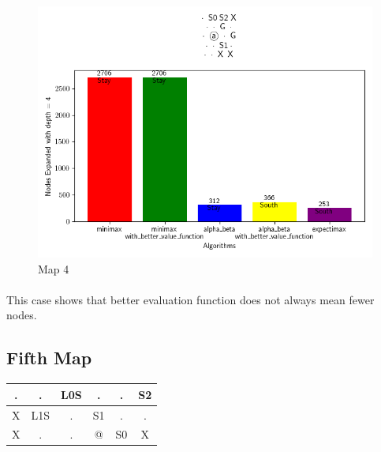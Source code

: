 \documentclass{article}
\begin{document}
\begin{figure}[h]
    \centering
    \includegraphics[width=\textwidth]{media/map2023_10_29_13_49_35.png}
    \caption{Map 4}
    \label{fig:image4}
\end{figure}
\vspace{1em}

\paragraph{}
This case shows that better evaluation function does not always mean fewer nodes.

\newpage
\subsection{Fifth Map}




\begin{table}[h]
    \centering
    \begin{tabular}{|c|c|c|c|c|c|}
    \hline
    . & . & L0S & . & . & S2 \\
    \hline
    X & L1S & . & S1 & . & . \\
    \hline
    X & . & . & @ & S0 & X \\
    \hline
    \end{tabular}
    \label{tab:updated_grid}
    \end{table}
        
\end{document}
